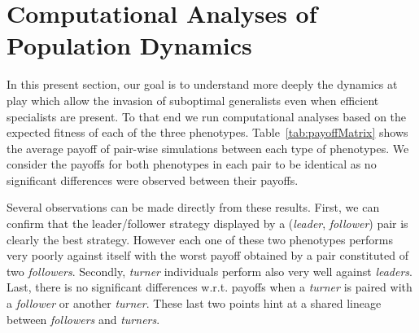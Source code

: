 \section{Computational Analyses of Population Dynamics}
  In this present section, our goal is to understand more deeply the dynamics at play which allow the invasion of suboptimal generalists even when efficient specialists are present. To that end we run computational analyses based on the expected fitness of each of the three phenotypes. Table~\ref{tab:payoffMatrix} shows the average payoff of pair-wise simulations between each type of phenotypes. We consider the payoffs for both phenotypes in each pair to be identical as no significant differences were observed between their payoffs.

  \begin{table}[h]
    \caption{\textbf{Payoff matrix for pair-wise simulations of each phenotype.} Average payoffs of each phenotype against every phenotype in a pair-wise simulation. Each pair was evaluated $10$ times in order to decrease the stochastic effects of the initial conditions (i.e. random positions of the targets).}
    \label{tab:payoffMatrix}
  \end{table}

  Several observations can be made directly from these results. First, we can confirm that the leader/follower strategy displayed by a (\emph{leader}, \emph{follower}) pair is clearly the best strategy. However each one of these two phenotypes performs very poorly against itself with the worst payoff obtained by a pair constituted of two \emph{followers}. Secondly, \emph{turner} individuals perform also very well against \emph{leaders}. Last, there is no significant differences w.r.t. payoffs when a \emph{turner} is paired with a \emph{follower} or another \emph{turner}. These last two points hint at a shared lineage between \emph{followers} and \emph{turners}. 

